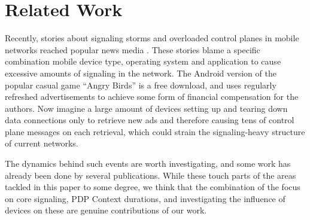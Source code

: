 


\section{Related Work}
\label{sec:relwork-CONEXT}



Recently, stories about signaling storms and overloaded control planes in mobile networks reached popular news media \cite{it2011birdandroid, lt2012docostorm}. These stories blame a specific combination mobile device type, operating system and application to cause excessive amounts of signaling in the network. The Android version of the popular casual game ``Angry Birds'' is a free download, and  uses regularly refreshed advertisements to achieve some form of financial compensation for the authors. Now imagine a large amount of devices setting up and tearing down data connections only to retrieve new ads and therefore causing tens of control plane messages on each retrieval, which could strain the signaling-heavy structure of current networks. 

The dynamics behind such events are worth investigating, and some work has already been done by several publications. While these touch parts of the areas tackled in this paper to some degree, we think that the combination of the focus on core signaling, PDP Context durations, and investigating the influence of devices on these are genuine contributions of our work.

